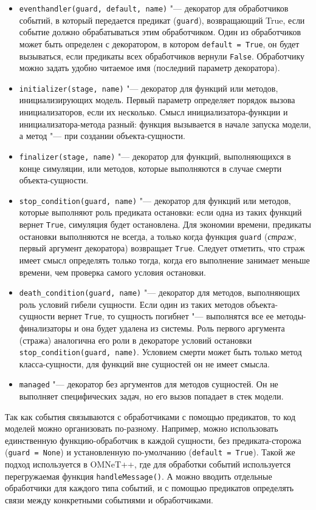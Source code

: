 \begin{itemize}
\item \texttt{eventhandler(guard, default, name)} "--- декоратор для обработчиков событий, в который передается предикат (\texttt{guard}), возвращающий True, если событие должно обрабатываться этим обработчиком. Один из обработчиков может быть определен с декоратором, в котором \texttt{default = True}, он будет вызываться, если предикаты всех обработчиков вернули \texttt{False}. Обработчику можно задать удобно читаемое имя (последний параметр декоратора).
\item \texttt{initializer(stage, name)} "--- декоратор для функций или методов, инициализирующих модель. Первый параметр определяет порядок вызова инициализаторов, если их несколько. Смысл инициализатора-функции и инициализатора-метода разный: функция вызывается в начале запуска модели, а метод "--- при создании объекта-сущности.
\item \texttt{finalizer(stage, name)} "--- декоратор для функций, выполняющихся в конце симуляции, или методов, которые выполняются в случае смерти объекта-сущности.
\item \texttt{stop\_condition(guard, name)} "--- декоратор для функций или методов, которые выполняют роль предиката остановки: если одна из таких функций вернет \texttt{True}, симуляция будет остановлена. Для экономии времени, предикаты остановки выполняются не всегда, а только когда функция \texttt{guard} (\textit{страж}, первый аргумент декоратора) возвращает \texttt{True}. Следует отметить, что страж имеет смысл определять только тогда, когда его выполнение занимает меньше времени, чем проверка самого условия остановки.
\item \texttt{death\_condition(guard, name)} "--- декоратор для методов, выполняющих роль условий гибели сущности. Если один из таких методов объекта-сущности вернет \texttt{True}, то сущность погибнет "--- выполнятся все ее методы-финализаторы и она будет удалена из системы. Роль первого аргумента (стража) аналогична его роли в декораторе условий остановки \texttt{stop\_condition(guard, name)}. Условием смерти может быть только метод класса-сущности, для функций вне сущностей он не имеет смысла.
\item \texttt{managed} "--- декоратор без аргументов для методов сущностей. Он не выполняет специфических задач, но его вызов попадает в стек модели.
\end{itemize}

Так как события связываются с обработчиками с помощью предикатов, то код моделей можно организовать по-разному. Например, можно использовать единственную функцию-обработчик в каждой сущности, без предиката-сторожа (\texttt{guard = None}) и установленную по-умолчанию (\texttt{default = True}). Такой же подход используется в OMNeT++, где для обработки событий используется перегружаемая функция \texttt{handleMessage()}. А можно вводить отдельные обработчики для каждого типа событий, и с помощью предикатов определять связи между конкретными событиями и обработчиками.

